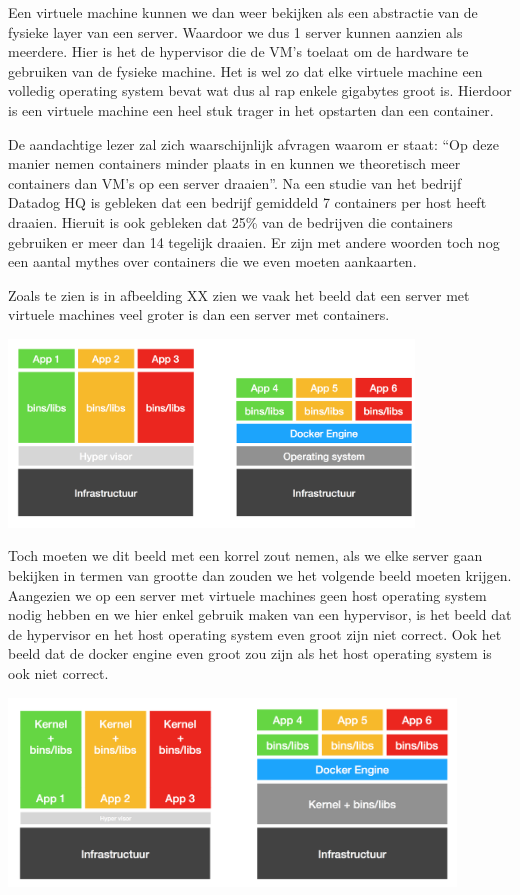 Een virtuele machine kunnen we dan weer bekijken als een abstractie van de fysieke layer van een server. Waardoor we dus 1 server kunnen aanzien als meerdere. Hier is het de hypervisor die de VM’s toelaat om de hardware te gebruiken van de fysieke machine. Het is wel zo dat elke virtuele machine een volledig operating system bevat wat dus al rap enkele gigabytes groot is. Hierdoor is een virtuele machine een heel stuk trager in het opstarten dan een container.

De aandachtige lezer zal zich waarschijnlijk afvragen waarom er staat: “Op deze manier nemen containers minder plaats in en kunnen we theoretisch meer containers dan VM’s op een server draaien”. 
Na een studie van het bedrijf Datadog HQ is gebleken dat een bedrijf gemiddeld 7 containers per host heeft draaien. Hieruit is ook gebleken dat 25\% van de bedrijven die containers gebruiken er meer dan 14 tegelijk draaien. Er zijn met andere woorden toch nog een aantal mythes over containers die we even moeten aankaarten.

Zoals te zien is in afbeelding XX zien we vaak het beeld dat een server met virtuele machines veel groter is dan een server met containers. 

\includegraphics[height=5cm]{img/docker1.png}

Toch moeten we dit beeld met een korrel zout nemen, als we elke server gaan bekijken in termen van grootte dan zouden we het volgende beeld moeten krijgen. Aangezien we op een server met virtuele machines geen host operating system nodig hebben en we hier enkel gebruik maken van een hypervisor, is het beeld dat de hypervisor en het host operating system even groot zijn niet correct. Ook het beeld dat de docker engine even groot zou zijn als het host operating system is ook niet correct.

\includegraphics[height=5cm]{img/docker2.png}

